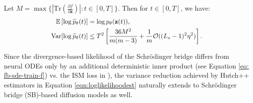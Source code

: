 \setcounter{equation}{15}
\begin{proposition}
Let \( M = \max\{|\mathrm{Tr}(\frac{\partial f}{\partial \mathbf{z}})| : t \in [0, T]\} \). Then for \( t \in [0, T] \), we have:
\begin{equation}
\scalebox{0.95}{$
\begin{aligned}
  \mathbb{E}\left[ \log \tilde{p}_\theta(t) \right] &= \log p_\theta(\mathbf{z}(t)),\\
  \mathrm{Var}[\log \tilde{p}_\theta(t)] &\leq T^2 \left[\frac{36M^2}{m(m-3)} + \frac{1}{m}\mathcal{O}((L_s-1)^2\eta^2)\right].
\end{aligned}\label{eqn:loglikelihoodest}$}
\end{equation}
\end{proposition}

Since the divergence-based likelihood of the Schrödinger bridge \citep{forward_backward_SDE, mSB} differs from neural ODEs only by an additional deterministic inner product (see Equation \ref{eq: fb-sde-train-f}) vs. the ISM loss in \cite{VSDM}), the variance reduction achieved by Hutch++ estimators in Equation \ref{eqn:loglikelihoodest} naturally extends to Schrödinger bridge (SB)-based diffusion models \citep{forward_backward_SDE, mSB, VSDM} as well.
